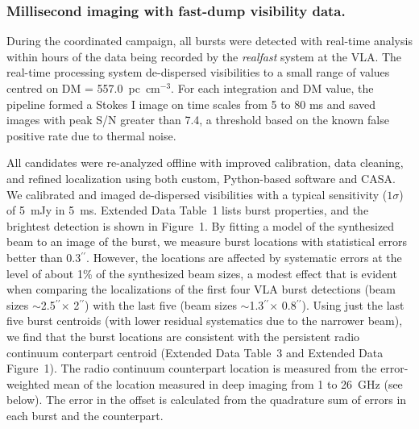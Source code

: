 \documentclass{nature_frb}
\newcommand{\arcsec}{\ensuremath{^{\prime\prime}}}
\begin{document}
\subsubsection*{Millisecond imaging with fast-dump visibility data.}
During the coordinated campaign, all bursts were detected with real-time analysis within hours of the data being recorded by the \emph{realfast}\cite{lbb+15} system at the VLA.  The real-time processing system de-dispersed visibilities to a small range of values centred on DM = 557.0~pc~cm$^{-3}$. For each integration and DM value, the pipeline formed a Stokes I image on time scales from 5 to 80 ms and saved images with peak S/N greater than 7.4, a threshold based on the known false positive rate due to thermal noise.

All candidates were re-analyzed offline with improved calibration, data cleaning, and refined localization using both custom, Python-based software and CASA. We calibrated and imaged de-dispersed visibilities with a typical sensitivity ($1\sigma$) of 5~mJy in 5~ms. Extended Data Table~1 lists burst properties, and the brightest detection is shown in Figure~1. By fitting a model of the synthesized beam to an image of the burst, we measure burst locations with statistical errors better than 0.3\arcsec. However, the locations are affected by systematic errors at the level of about 1\% of the synthesized beam sizes, a modest effect that is evident when comparing the localizations of the first four VLA burst detections (beam sizes $\sim$2.5\arcsec $\times$ 2\arcsec) with the last five (beam sizes $\sim$1.3\arcsec $\times$ 0.8\arcsec).
Using just the last five burst centroids (with lower residual systematics due to the narrower beam), we find that the burst locations are consistent with the persistent radio continuum conterpart centroid (Extended Data Table~3 and Extended Data Figure~1). The radio continuum counterpart location is measured from the error-weighted mean of the location measured in deep imaging from 1 to 26~GHz (see below). The error in the offset is calculated from the quadrature sum of errors in each burst and the counterpart.
\end{document}
